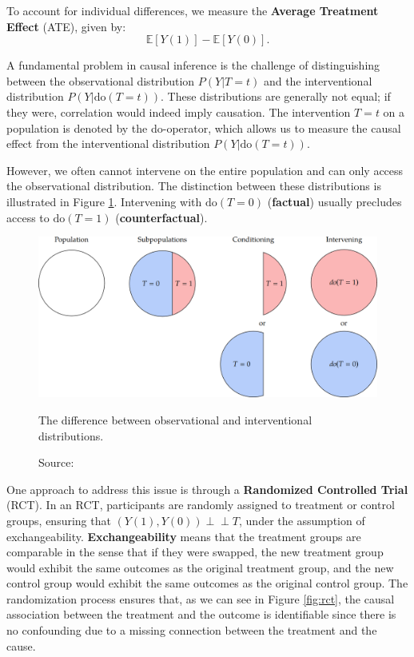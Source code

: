 To account for individual differences, we measure the
\textbf{Average Treatment Effect} (ATE), given by:
\begin{equation}
\mathbb{E}[Y(1)] - \mathbb{E}[Y(0)].
\end{equation}

A fundamental problem in causal inference is the challenge
of distinguishing between the observational distribution
\( P(Y|T=t) \) and the interventional distribution \( P(Y|\text{do}(T=t)) \).
These distributions are generally not equal; if they were, correlation
would indeed imply causation. The intervention \( T=t \) on a population
is denoted by the do-operator, which allows us to measure the causal
effect from the interventional distribution \( P(Y|\text{do}(T=t)) \).

However, we often cannot intervene on the entire population
and can only access the observational distribution.
The distinction between these distributions is illustrated
in Figure \ref{fig:dooperator}.
Intervening with \( \text{do}(T=0) \) (\textbf{factual}) usually
precludes access to \( \text{do}(T=1) \) (\textbf{counterfactual}).

\begin{figure}[h]
    \centering
    \includegraphics[width=.9\textwidth]{figures/ch3/12.dooperator.png}
    \caption{The difference between observational and interventional distributions.}
    \vspace{-10px}
    \caption*{\scriptsize{Source: \cite{Neal_2020a}}}
    \label{fig:dooperator}
\end{figure}

One approach to address this issue is
through a \textbf{Randomized Controlled Trial} (RCT). In an RCT, participants
are randomly assigned to treatment or control groups, ensuring that
\( (Y(1), Y(0)) \perp\!\!\!\perp T \), under the assumption of exchangeability.
\textbf{Exchangeability} means that the treatment groups are comparable in the
sense that if they were swapped, the new treatment group would exhibit
the same outcomes as the original treatment group, and the new control
group would exhibit the same outcomes as the original control group.
The randomization process ensures that, as we can see in Figure \ref{fig:rct},
the causal association between the treatment and the outcome is identifiable
since there is no confounding due to a missing connection between the
treatment and the cause.

